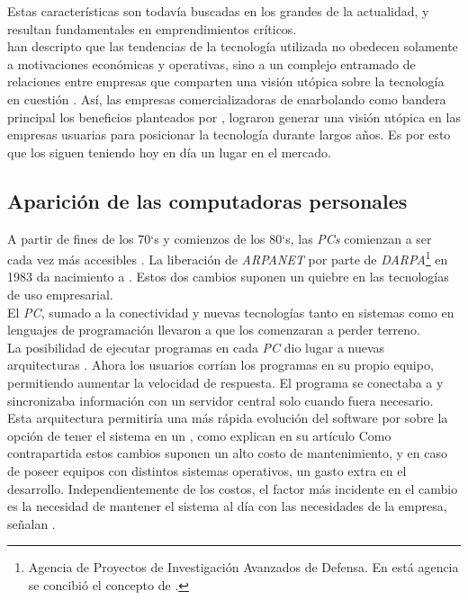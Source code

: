 Estas características son todavía buscadas en los grandes \mainframes de la
actualidad, y resultan fundamentales en emprendimientos críticos.\\
 han descripto que las tendencias de la
tecnología utilizada no obedecen solamente a motivaciones económicas y 
operativas, sino a un complejo entramado de relaciones entre empresas que 
comparten una visión utópica sobre la tecnología en cuestión
. Así, las empresas comercializadoras de
\mainframes enarbolando como bandera principal los beneficios planteados por
\citeauthor{Stephens:2008:BOOK}, lograron generar una visión utópica en las
empresas usuarias para posicionar la tecnología durante largos años. Es por 
esto que los \mainframes siguen teniendo hoy en día un lugar en el mercado.\\
 
\subsection{Aparición de las computadoras personales}
\label{subsec:history:about_web:pc_era}

A partir de fines de los 70`s y comienzos de los 80`s, las \emph{PCs}
comienzan a ser cada vez más accesibles .
La liberación de \emph{ARPANET} por parte de \emph{DARPA}\footnote{
	Agencia de Proyectos de Investigación Avanzados de Defensa. En está agencia 
	se concibió el concepto de \internet.
} en 1983 da nacimiento a \internet. Estos dos cambios suponen un quiebre en 
las tecnologías de uso empresarial.\\
El \emph{PC}, sumado a la conectividad y nuevas tecnologías tanto en sistemas
como en lenguajes de programación llevaron a que los \mainframes comenzaran a
perder terreno.\\
La posibilidad de ejecutar programas en cada \emph{PC} dio lugar a nuevas
arquitecturas \clientserver. Ahora los usuarios corrían los programas en su 
propio equipo, permitiendo aumentar la velocidad de respuesta. El programa se
conectaba a \internet y sincronizaba información con un servidor central solo 
cuando fuera necesario.\\
Esta arquitectura permitiría una más rápida evolución del software por sobre la 
opción de tener el sistema en un \mainframe, como explican
 en su artículo 
\period Como contrapartida estos cambios suponen
un alto costo de mantenimiento, y en caso de poseer equipos con distintos
sistemas operativos, un gasto extra en el desarrollo. Independientemente de los 
costos, el factor más incidente en el cambio es la necesidad de mantener el 
sistema al día con las necesidades de la empresa, señalan 
\citeauthor{Duncan:1996:ARTICLE}.

